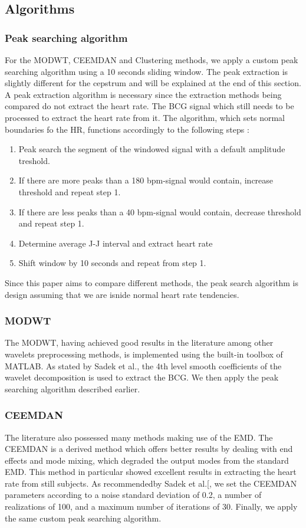 \documentclass[twoside,twocolumn]{article}
\begin{document}
	\subsection{Algorithms}
	\label{subsection:Methodology:Algorithms}
		\subsubsection{Peak searching algorithm}
		For the MODWT, CEEMDAN and Clustering methods, we apply a custom peak searching algorithm using a 10 seconds sliding window. The peak extraction is slightly different for the cepstrum and will be explained at the end of this section. A peak extraction algorithm is necessary since the extraction methods being compared do not extract the heart rate. The BCG signal which still needs to be processed to extract the heart rate from it. The algorithm, which sets normal boundaries fo the HR\cite{zhu_heart_2014}, functions accordingly to the following steps :
	\begin{enumerate}
		\item Peak search the segment of the windowed signal with a default amplitude treshold.
		\item If there are more peaks than a 180 bpm-signal would contain, increase threshold and repeat step 1.
		\item If there are less peaks than a 40 bpm-signal would contain, decrease threshold and repeat step 1.
		\item Determine average J-J interval and extract heart rate
		\item Shift window by 10 seconds and repeat from step 1.
	\end{enumerate}
	Since this paper aims to compare different methods, the peak search algorithm is design assuming that we are isnide normal heart rate tendencies.
		\subsubsection{MODWT}
		The MODWT, having achieved good results in the literature among other wavelets preprocessing methods, is implemented using the built-in toolbox of MATLAB. As stated by Sadek et al.\cite{sadek_continuous_2017}, the 4th level smooth coefficients of the wavelet decomposition is used to extract the BCG. We then apply the peak searching algorithm described earlier.
		\subsubsection{CEEMDAN}
		The literature also possessed many methods making use of the EMD. The CEEMDAN is a derived method which offers better results by dealing with end effects and mode mixing, which degraded the output modes from the standard EMD. This method in particular showed excellent results in extracting the heart rate from still subjects\cite{sadek_continuous_2017}. As recommendedby Sadek et al.[\cite{sadek_automatic_2015}, we set the CEEMDAN parameters according to a noise standard deviation of 0.2, a number of realizations of 100, and a maximum number of iterations of 30. Finally, we apply the same custom peak searching algorithm.
\end{document}
